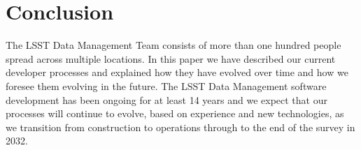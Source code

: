 \section{Conclusion}

The LSST Data Management Team consists of more than one hundred people spread across multiple locations.
In this paper we have described our current developer processes and explained how they have evolved over time and how we foresee them evolving in the future.
The LSST Data Management software development has been ongoing for at least 14 years and we expect that our processes will continue to evolve, based on experience and new technologies, as we transition from construction to operations through to the end of the survey in 2032.

